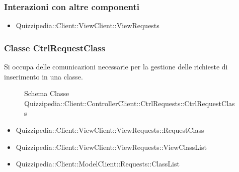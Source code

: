 \subsubsection{Interazioni con altre componenti}
\begin{itemize}
\item Quizzipedia::Client::ViewClient::ViewRequests
\end{itemize}
\subsubsection{Classe CtrlRequestClass}
Si occupa delle comunicazioni necessarie per la gestione delle richieste di inserimento in una classe.
\begin{figure}[H]
\centering
\noindent{}
\caption{Schema Classe Quizzipedia::Client::ControllerClient::CtrlRequests::CtrlRequestClass}
\end{figure}
\begin{itemize}
\item Quizzipedia::Client::ViewClient::ViewRequests::RequestClass
\item Quizzipedia::Client::ViewClient::ViewRequests::ViewClassList
\end{itemize}
\begin{itemize}
\item Quizzipedia::Client::ModelClient::Requests::ClassList
\end{itemize}

